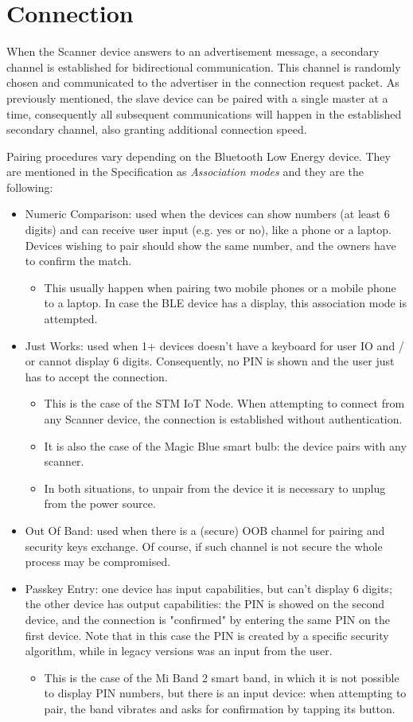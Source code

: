 \section{Connection}
When the Scanner device answers to an advertisement message, a secondary channel is established for bidirectional communication. This channel is randomly chosen and communicated to the advertiser in the connection request packet. As previously mentioned, the slave device can be paired with a single master at a time, consequently all subsequent communications will happen in the established secondary channel, also granting additional connection speed.

Pairing procedures vary depending on the Bluetooth Low Energy device. They are mentioned in the Specification as \textit{Association modes} and they are the following:
\begin{itemize}
	\item Numeric Comparison: used when the devices can show numbers (at least 6 digits) and can receive user input (e.g. yes or no), like a phone or a laptop. Devices wishing to pair should show the same number, and the owners have to confirm the match.
	\begin{itemize}
		\item This usually happen when pairing two mobile phones or a mobile phone to a laptop. In case the BLE device has a display, this association mode is attempted.
	\end{itemize}
	\item Just Works: used when 1+ devices doesn't have a keyboard for user IO and / or cannot display 6 digits. Consequently, no PIN is shown and the user just has to accept the connection.
	\begin{itemize}
		\item This is the case of the STM IoT Node. When attempting to connect from any Scanner device, the connection is established without authentication.
		\item It is also the case of the Magic Blue smart bulb: the device pairs with any scanner.
		\item In both situations, to unpair from the device it is necessary to unplug from the power source.
	\end{itemize}
	\item Out Of Band: used when there is a (secure) OOB channel for pairing and security keys exchange. Of course, if such channel is not secure the whole process may be compromised.
	\item Passkey Entry: one device has input capabilities, but can't display 6 digits; the other device has output capabilities: the PIN is showed on the second device, and the connection is "confirmed" by entering the same PIN on the first device. Note that in this case the PIN is created by a specific security algorithm, while in legacy versions was an input from the user.
	\begin{itemize}
		\item This is the case of the Mi Band 2 smart band, in which it is not possible to display PIN numbers, but there is an input device: when attempting to pair, the band vibrates and asks for confirmation by tapping its button.
	\end{itemize}
\end{itemize}